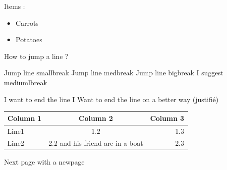 \documentclass[12pt]{article}
\begin{document}
\bigbreak
\bigbreak

Items :
\begin{itemize}
\item Carrots
\item Potatoes
\end{itemize}

\bigbreak
\bigbreak

How to jump a line ?

Jump line smallbreak
\smallbreak
Jump line medbreak
\medbreak
Jump line bigbreak
\bigbreak
I suggest mediumlbreak

I want to end the line \newline
I Want to end the line on a better way (justifié) \linebreak

\bigbreak
\bigbreak

\begin{tabular}{|l|c|r|}
  \hline
  Column 1 & Column 2 & Column 3 \\
  \hline
  Line1 & 1.2 & 1.3 \\  \hline
  Line2 & 2.2 and his friend are in a boat& 2.3 \\ \hline
\end{tabular}



\newpage

Next page with a newpage
\end{document}

